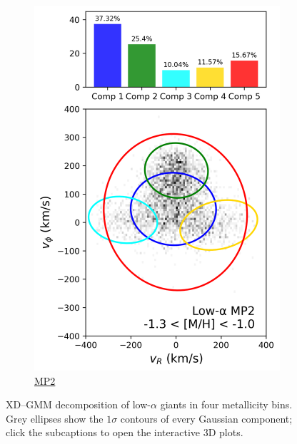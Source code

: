 \documentclass[a4paper,12pt]{article}
\begin{document}
\begin{figure}[H]
\begin{subfigure}{0.24\linewidth}
    \includegraphics[width=\linewidth]{../figures/gmm_mp2_low_alpha_k6.png}
    \caption{\href{https://raw.githack.com/raunaq-rai/Disentangling-the-Milky-Way-using-GMM/main/figures/MP2_low____-1.3\%5BM_H\%5D-1.0.html}{MP2}}
    \label{fig:gmm_mp2_lo}
  \end{subfigure}

  \caption{XD–GMM decomposition of low-$\alpha$ giants in four metallicity
           bins.  Grey ellipses show the $1\sigma$ contours of every Gaussian component; click the subcaptions to open the interactive 3D plots.}
  \label{fig:gmm_lowalpha_panel}
\end{figure}
\end{document}
